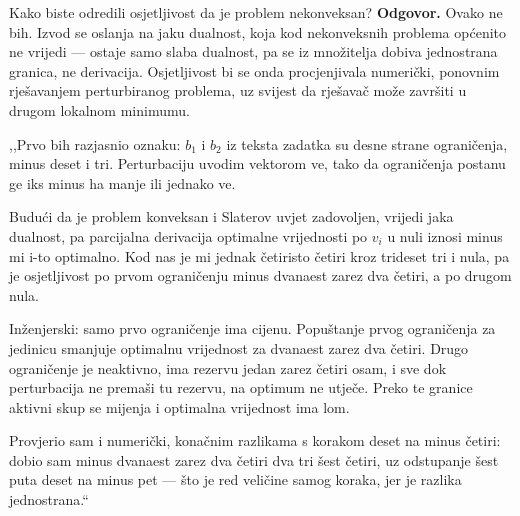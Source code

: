 \begin{pitanje}{Kako biste odredili osjetljivost da je problem nekonveksan?}
\textbf{Odgovor.} Ovako ne bih. Izvod se oslanja na jaku dualnost, koja kod
nekonveksnih problema općenito ne vrijedi --- ostaje samo slaba dualnost, pa se
iz množitelja dobiva jednostrana granica, ne derivacija. Osjetljivost bi se onda
procjenjivala numerički, ponovnim rješavanjem perturbiranog problema, uz svijest
da rješavač može završiti u drugom lokalnom minimumu.
\end{pitanje}

\begin{izgovor}
,,Prvo bih razjasnio oznaku: $b_1$ i $b_2$ iz teksta zadatka su desne strane
ograničenja, minus deset i tri. Perturbaciju uvodim vektorom ve, tako da
ograničenja postanu ge iks minus ha manje ili jednako ve.

Budući da je problem konveksan i Slaterov uvjet zadovoljen, vrijedi jaka
dualnost, pa parcijalna derivacija optimalne vrijednosti po $v_i$ u nuli iznosi
minus mi i-to optimalno. Kod nas je mi jednak četiristo četiri kroz trideset tri i
nula, pa je osjetljivost po prvom ograničenju minus dvanaest zarez dva četiri, a
po drugom nula.

Inženjerski: samo prvo ograničenje ima cijenu. Popuštanje prvog ograničenja za
jedinicu smanjuje optimalnu vrijednost za dvanaest zarez dva četiri. Drugo
ograničenje je neaktivno, ima rezervu jedan zarez četiri osam, i sve dok
perturbacija ne premaši tu rezervu, na optimum ne utječe. Preko te granice
aktivni skup se mijenja i optimalna vrijednost ima lom.

Provjerio sam i numerički, konačnim razlikama s korakom deset na minus četiri:
dobio sam minus dvanaest zarez dva četiri dva tri šest četiri, uz odstupanje šest
puta deset na minus pet --- što je red veličine samog koraka, jer je razlika
jednostrana.``
\end{izgovor}
